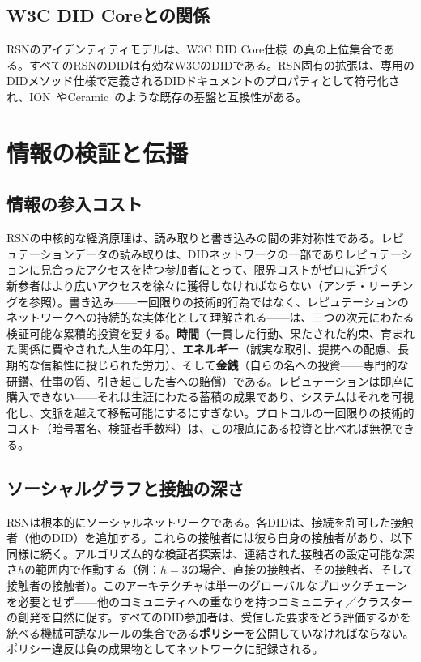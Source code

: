 \documentclass[11pt,a4paper,twocolumn]{article}
\begin{document}
\subsection{W3C DID Coreとの関係}

RSNのアイデンティティモデルは、W3C DID Core仕様~\cite{did2022}の真の上位集合である。すべてのRSNのDIDは有効なW3CのDIDである。RSN固有の拡張は、専用のDIDメソッド仕様で定義されるDIDドキュメントのプロパティとして符号化され、ION~\cite{buchner2021}やCeramic~\cite{ceramic2023}のような既存の基盤と互換性がある。

\section{情報の検証と伝播}

\subsection{情報の参入コスト}

RSNの中核的な経済原理は、読み取りと書き込みの間の非対称性である。レピュテーションデータの読み取りは、DIDネットワークの一部でありレピュテーションに見合ったアクセスを持つ参加者にとって、限界コストがゼロに近づく——新参者はより広いアクセスを徐々に獲得しなければならない（アンチ・リーチングを参照）。書き込み——一回限りの技術的行為ではなく、レピュテーションのネットワークへの持続的な実体化として理解される——は、三つの次元にわたる検証可能な累積的投資を要する。\textbf{時間}（一貫した行動、果たされた約束、育まれた関係に費やされた人生の年月）、\textbf{エネルギー}（誠実な取引、提携への配慮、長期的な信頼性に投じられた労力）、そして\textbf{金銭}（自らの名への投資——専門的な研鑽、仕事の質、引き起こした害への賠償）である。レピュテーションは即座に購入できない——それは生涯にわたる蓄積の成果であり、システムはそれを可視化し、文脈を越えて移転可能にするにすぎない。プロトコルの一回限りの技術的コスト（暗号署名、検証者手数料）は、この根底にある投資と比べれば無視できる。

\subsection{ソーシャルグラフと接触の深さ}

RSNは根本的にソーシャルネットワークである。各DIDは、接続を許可した接触者（他のDID）を追加する。これらの接触者には彼ら自身の接触者があり、以下同様に続く。アルゴリズム的な検証者探索は、連結された接触者の設定可能な深さ$h$の範囲内で作動する（例：$h=3$の場合、直接の接触者、その接触者、そして接触者の接触者）。このアーキテクチャは単一のグローバルなブロックチェーンを必要とせず——他のコミュニティへの重なりを持つコミュニティ／クラスターの創発を自然に促す。すべてのDID参加者は、受信した要求をどう評価するかを統べる機械可読なルールの集合である\textbf{ポリシー}を公開していなければならない。ポリシー違反は負の成果物としてネットワークに記録される。
\end{document}
